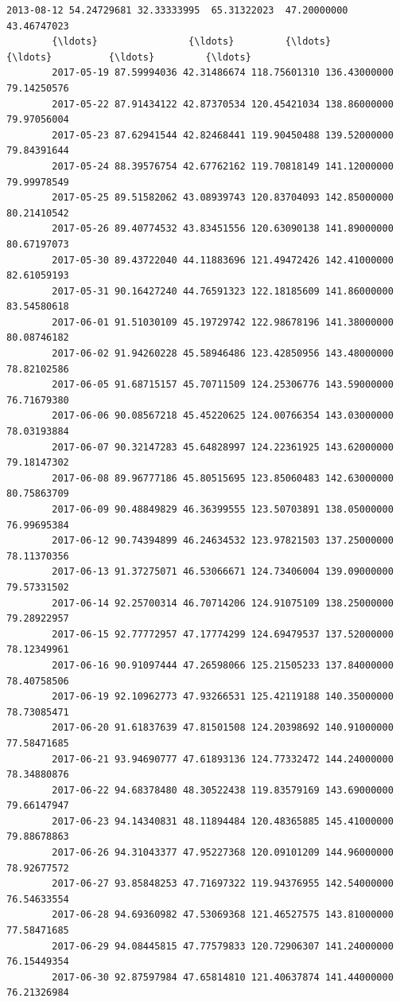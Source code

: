\documentclass[11pt]{article}
\begin{document}
\begin{Verbatim}[commandchars=\\\{\}]
        2013-08-12 54.24729681 32.33333995  65.31322023  47.20000000 43.46747023   
        {\ldots}                {\ldots}         {\ldots}          {\ldots}          {\ldots}         {\ldots}   
        2017-05-19 87.59994036 42.31486674 118.75601310 136.43000000 79.14250576   
        2017-05-22 87.91434122 42.87370534 120.45421034 138.86000000 79.97056004   
        2017-05-23 87.62941544 42.82468441 119.90450488 139.52000000 79.84391644   
        2017-05-24 88.39576754 42.67762162 119.70818149 141.12000000 79.99978549   
        2017-05-25 89.51582062 43.08939743 120.83704093 142.85000000 80.21410542   
        2017-05-26 89.40774532 43.83451556 120.63090138 141.89000000 80.67197073   
        2017-05-30 89.43722040 44.11883696 121.49472426 142.41000000 82.61059193   
        2017-05-31 90.16427240 44.76591323 122.18185609 141.86000000 83.54580618   
        2017-06-01 91.51030109 45.19729742 122.98678196 141.38000000 80.08746182   
        2017-06-02 91.94260228 45.58946486 123.42850956 143.48000000 78.82102586   
        2017-06-05 91.68715157 45.70711509 124.25306776 143.59000000 76.71679380   
        2017-06-06 90.08567218 45.45220625 124.00766354 143.03000000 78.03193884   
        2017-06-07 90.32147283 45.64828997 124.22361925 143.62000000 79.18147302   
        2017-06-08 89.96777186 45.80515695 123.85060483 142.63000000 80.75863709   
        2017-06-09 90.48849829 46.36399555 123.50703891 138.05000000 76.99695384   
        2017-06-12 90.74394899 46.24634532 123.97821503 137.25000000 78.11370356   
        2017-06-13 91.37275071 46.53066671 124.73406004 139.09000000 79.57331502   
        2017-06-14 92.25700314 46.70714206 124.91075109 138.25000000 79.28922957   
        2017-06-15 92.77772957 47.17774299 124.69479537 137.52000000 78.12349961   
        2017-06-16 90.91097444 47.26598066 125.21505233 137.84000000 78.40758506   
        2017-06-19 92.10962773 47.93266531 125.42119188 140.35000000 78.73085471   
        2017-06-20 91.61837639 47.81501508 124.20398692 140.91000000 77.58471685   
        2017-06-21 93.94690777 47.61893136 124.77332472 144.24000000 78.34880876   
        2017-06-22 94.68378480 48.30522438 119.83579169 143.69000000 79.66147947   
        2017-06-23 94.14340831 48.11894484 120.48365885 145.41000000 79.88678863   
        2017-06-26 94.31043377 47.95227368 120.09101209 144.96000000 78.92677572   
        2017-06-27 93.85848253 47.71697322 119.94376955 142.54000000 76.54633554   
        2017-06-28 94.69360982 47.53069368 121.46527575 143.81000000 77.58471685   
        2017-06-29 94.08445815 47.77579833 120.72906307 141.24000000 76.15449354   
        2017-06-30 92.87597984 47.65814810 121.40637874 141.44000000 76.21326984   
        

\end{Verbatim}
\end{document}
